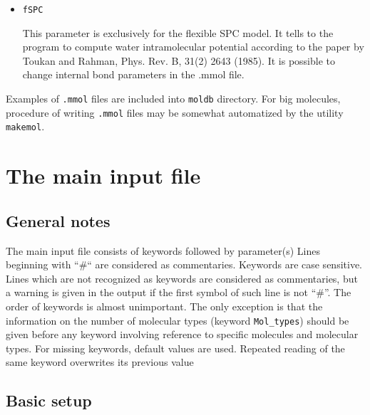 \documentclass{article}
\begin{document}
\begin{itemize}
\item
\verb|fSPC|

This parameter is exclusively for the flexible SPC model. It tells to the 
program to compute water intramolecular potential according to the paper 
by Toukan and Rahman,  Phys. Rev. B, 31(2) 2643 (1985). It is possible to 
change internal bond parameters in the .mmol file.


\end{itemize}

Examples of \verb|.mmol| files are included into \verb|moldb| directory.
For big molecules, procedure of writing \verb|.mmol| files may be
somewhat automatized by the utility \verb|makemol|.

\section{The main input file}

\subsection{General notes}
The main input file consists of keywords followed by parameter(s)
Lines beginning with ``\#`` are considered as commentaries.
Keywords are case sensitive.
Lines which are not recognized as keywords are considered as commentaries,
but a warning is given in the output if the first symbol of such line is not 
``\#''.  The order of keywords is almost unimportant. The only exception is
that the information on the number of molecular types 
(keyword \verb|Mol_types|) should be given before any keyword involving 
reference to specific molecules and molecular types. For missing keywords, 
default values are used.
Repeated reading of the same keyword overwrites its previous value

\subsection{Basic setup}
\end{document}
